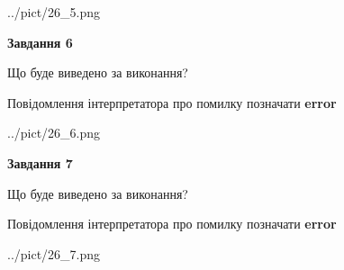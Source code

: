 \documentclass[10pt, ukrainian]{article}
\begin{document}
{\begin {large}
\begin{center}
	{../pict/26_5.png}
\end{center}
\newpage

{\begin {center}\textbf{Завдання 6}\end {center}}\par
Що буде виведено за виконання? \par
Повідомлення інтерпретатора про помилку позначати \textbf{error}

\begin{center}
	{../pict/26_6.png}
\end{center}
\newpage

{\begin {center}\textbf{Завдання 7}\end {center}}\par
Що буде виведено за виконання? \par
Повідомлення інтерпретатора про помилку позначати \textbf{error}

\begin{center}
	{../pict/26_7.png}
\end{center}
\newpage

\end {large}}
\end{document}
